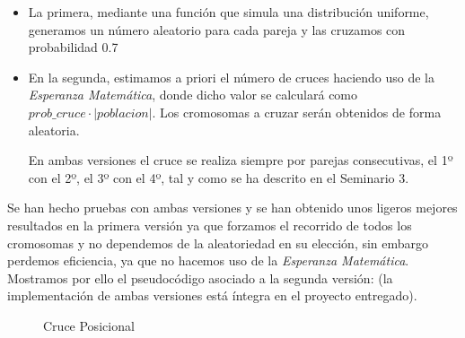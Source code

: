 \begin{itemize}
	\item La primera, mediante una función que simula una distribución uniforme, generamos un número aleatorio para cada pareja y las cruzamos con probabilidad 0.7
	
	\item En la segunda, estimamos a priori el número de cruces haciendo uso de la \textit{Esperanza Matemática}, donde dicho valor se calculará como  $prob\_cruce \cdot |poblacion|$. Los cromosomas a cruzar serán obtenidos de forma aleatoria.
	
	En ambas versiones el cruce se realiza siempre por parejas consecutivas, el 1º con el 2º, el 3º con el 4º, tal y como se ha descrito en el Seminario 3.
\end{itemize}


Se han hecho pruebas con ambas versiones y se han obtenido unos ligeros mejores resultados en la primera versión ya que forzamos el recorrido de todos los cromosomas y no dependemos de la aleatoriedad en su elección, sin embargo perdemos eficiencia, ya que no hacemos uso de la \textit{Esperanza Matemática}.  Mostramos por ello el pseudocódigo asociado a la segunda versión: (la implementación de ambas versiones está íntegra en el proyecto entregado). 




\begin{figure}[H]
	\centering
	\begin{minipage}{.9\linewidth}
		
		
		
		\begin{algorithm}[H] 
			
			\caption{Cruce Posicional}
			\SetAlgoLined
			
			
			
			
		\end{algorithm} 
		
	\end{minipage}
\end{figure}

